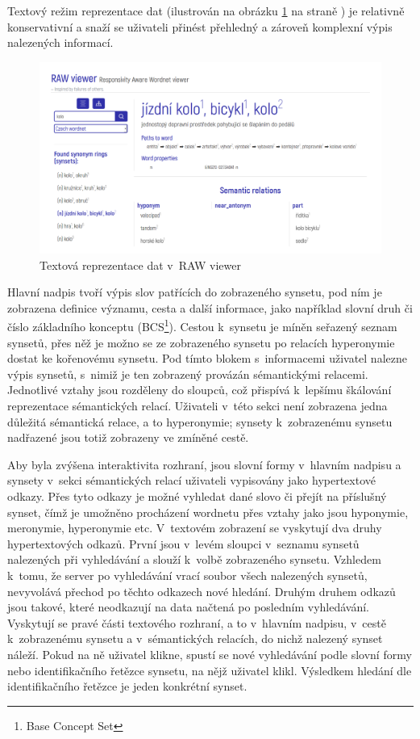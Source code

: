 \documentclass[a4paper,11pt,openany,twoside]{book}
\newcommand{\simplywn}{RAW viewer }
\begin{document}
				Textový režim reprezentace dat (ilustrován na obrázku \ref{fig:simplywn_text} na straně \pageref{fig:simplywn_text}) je relativně konservativní a snaží se uživateli přinést přehledný a zároveň komplexní výpis nalezených informací.

				\begin{figure}[h]
					\centering
					\includegraphics[width=1.0\textwidth]{simplywn_text.png}
					\caption{Textová reprezentace dat v~\simplywn}
					\label{fig:simplywn_text}
				\end{figure} 

				Hlavní nadpis tvoří výpis slov patřících do zobrazeného synsetu, pod ním je zobrazena definice významu, cesta a další informace, jako například slovní druh či číslo základního konceptu (BCS\footnote{Base Concept Set}). Cestou k~synsetu je míněn seřazený seznam synsetů, přes něž je možno se ze zobrazeného synsetu po relacích hyperonymie dostat ke kořenovému synsetu. Pod tímto blokem s~informacemi uživatel nalezne výpis synsetů, s~nimiž je ten zobrazený provázán sémantickými relacemi. Jednotlivé vztahy jsou rozděleny do sloupců, což přispívá k~lepšímu škálování reprezentace sémantických relací. Uživateli v~této sekci není zobrazena jedna důležitá sémantická relace, a to hyperonymie; synsety k~zobrazenému synsetu nadřazené jsou totiž zobrazeny ve zmíněné cestě.

				Aby byla zvýšena interaktivita rozhraní, jsou slovní formy v~hlavním nadpisu a synsety v~sekci sémantických relací uživateli vypisovány jako hypertextové odkazy. Přes tyto odkazy je možné vyhledat dané slovo či přejít na příslušný synset, čímž je umožněno procházení wordnetu přes vztahy jako jsou hyponymie, meronymie, hyperonymie etc. V~textovém zobrazení se vyskytují dva druhy hypertextových odkazů. První jsou v~levém sloupci v~seznamu synsetů nalezených při vyhledávání a slouží k~volbě zobrazeného synsetu. Vzhledem k~tomu, že server po vyhledávání vrací soubor všech nalezených synsetů, nevyvolává přechod po těchto odkazech nové hledání. Druhým druhem odkazů jsou takové, které neodkazují na data načtená po posledním vyhledávání. Vyskytují se pravé části textového rozhraní, a to v~hlavním nadpisu, v~cestě k~zobrazenému synsetu a v~sémantických relacích, do nichž nalezený synset náleží. Pokud na ně uživatel klikne, spustí se nové vyhledávání podle slovní formy nebo identifikačního řetězce synsetu, na nějž uživatel klikl. Výsledkem hledání dle identifikačního řetězce je jeden konkrétní synset.
\end{document}
